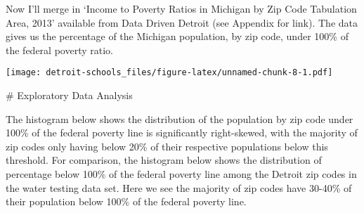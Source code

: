 \documentclass[
]{article}
\newenvironment{Shaded}{\begin{snugshade}}{\end{snugshade}}
\newcommand{\AttributeTok}[1]{\textcolor[rgb]{0.77,0.63,0.00}{#1}}
\newcommand{\CommentTok}[1]{\textcolor[rgb]{0.56,0.35,0.01}{\textit{#1}}}
\newcommand{\DecValTok}[1]{\textcolor[rgb]{0.00,0.00,0.81}{#1}}
\newcommand{\FunctionTok}[1]{\textcolor[rgb]{0.00,0.00,0.00}{#1}}
\newcommand{\NormalTok}[1]{#1}
\newcommand{\OtherTok}[1]{\textcolor[rgb]{0.56,0.35,0.01}{#1}}
\newcommand{\SpecialCharTok}[1]{\textcolor[rgb]{0.00,0.00,0.00}{#1}}
\newcommand{\StringTok}[1]{\textcolor[rgb]{0.31,0.60,0.02}{#1}}
\begin{document}
Now I'll merge in `Income to Poverty Ratios in Michigan by Zip Code
Tabulation Area, 2013' available from Data Driven Detroit (see Appendix
for link). The data gives us the percentage of the Michigan population,
by zip code, under 100\% of the federal poverty ratio.

\begin{Shaded}
\end{Shaded}

\texttt{[image: detroit-schools\_files/figure-latex/unnamed-chunk-8-1.pdf]}

\begin{Shaded}
\end{Shaded}

\# Exploratory Data Analysis

The histogram below shows the distribution of the population by zip code
under 100\% of the federal poverty line is significantly right-skewed,
with the majority of zip codes only having below 20\% of their
respective populations below this threshold. For comparison, the
histogram below shows the distribution of percentage below 100\% of the
federal poverty line among the Detroit zip codes in the water testing
data set. Here we see the majority of zip codes have 30-40\% of their
population below 100\% of the federal poverty line.
\end{document}
